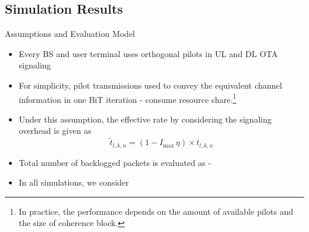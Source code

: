 \documentclass[9pt]{beamer}
\let\oldfootnote\footnote
\renewcommand\footnote[1][]{\oldfootnote[frame,#1]}
\begin{document}
\subsection{Simulation Results}

\begin{frame}{Assumptions and Evaluation Model}
	\begin{itemize}
		\item Every \ac{BS} and user terminal uses \textcolor[rgb]{0,0.6,0}{orthogonal pilots in UL and DL \ac{OTA} signaling}
		\item For simplicity, pilot transmissions used to convey the equivalent channel information in one \ac{BiT} iteration - \textcolor[rgb]{0,0,0.6}{consume \eqn{\eta} resource share}.\footnote{In practice, the performance depends on the amount of available pilots and the size of coherence block.}
		\item Under this assumption, the effective rate by considering the signaling overhead is given as
		\begin{equation} \label{penalty}
		\tilde{t}_{l,k,n} = \left ( 1 - I_{\max} \, \eta \right ) \times t_{l,k,n}
		\end{equation}
		\item Total number of backlogged packets is evaluated as - 
		\item In all simulations, \textcolor[rgb]{0.6,0,0}{we consider }
	\end{itemize}	
\end{frame}
\end{document}
